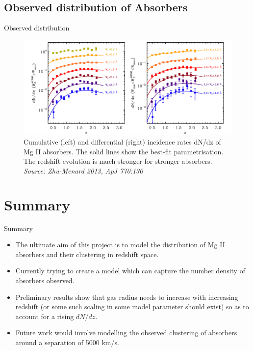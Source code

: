 \documentclass{beamer}
\begin{document}
	\subsection{Observed distribution of Absorbers}
	\begin{frame}{Observed distribution}
		\begin{figure}
			\includegraphics[width=\textwidth]{obs-distrib.png}
			\caption{\tiny  Cumulative (left) and differential (right) incidence rates dN/dz of Mg II absorbers. The solid lines show the best-fit parametrisation. The	redshift evolution is much stronger for stronger absorbers. \emph{Source: Zhu-Menard 2013, ApJ 770:130}}
			\label{fig:Zhu-Men13}
		\end{figure}
	\end{frame}
\section{Summary}
	\begin{frame}{Summary}
		\begin{itemize}
			\item The ultimate aim of this project is to model the distribution of Mg II absorbers and their clustering in redshift space.
			\item Currently trying to create a model which can capture the number density of absorbers observed.
			\item Preliminary results show that gas radius needs to increase with increasing redshift (or some such scaling in some model parameter should exist) so as to account for a rising $dN/dz$.
			\item Future work would involve modelling the observed clustering of absorbers around a separation of 5000 km/s.
		\end{itemize}
	\end{frame}
\end{document}
